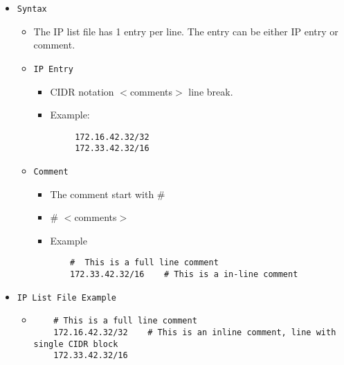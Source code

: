 \documentclass[english]{report}
\begin{document}
\begin{itemize}

\item[] \texttt{Syntax}
\begin{itemize}
\item[]   The IP list file has 1 entry per line. The entry can be either IP entry or 
    comment.
\end{itemize}

\begin{itemize}
\item[] \texttt{IP Entry}
\begin{itemize}
\item[]   CIDR notation $<$comments$>$ line break.
\item[]   Example:
\footnotesize
\begin{verbatim}
     172.16.42.32/32
     172.33.42.32/16
\end{verbatim}
\normalsize
\end{itemize}

\item[] \texttt{Comment}
\begin{itemize}
\item[]   The comment start with \#
\item[]   \#  $<$comments$>$
\item[]  Example
\footnotesize
\begin{verbatim}
    #  This is a full line comment
    172.33.42.32/16    # This is a in-line comment
\end{verbatim}
\normalsize
\end{itemize}

\end{itemize}

\item[] \texttt{IP List File Example}
\begin{itemize}

\item[]
\footnotesize
\begin{verbatim}
    # This is a full line comment
    172.16.42.32/32    # This is an inline comment, line with single CIDR block
    172.33.42.32/16
\end{verbatim}
\normalsize
\end{itemize}
\end{itemize}
\end{document}
